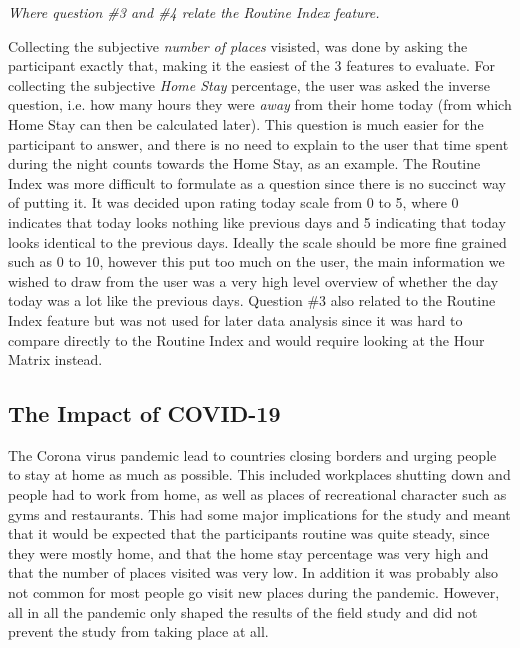 \textit{Where question \#3 and \#4 relate the Routine Index feature.}

Collecting the subjective \textit{number of places} visisted, was done by asking the participant exactly that, making it the easiest of the 3 features to evaluate. For collecting the subjective \textit{Home Stay} percentage, the user was asked the inverse question, i.e. how many hours they were \textit{away} from their home today (from which Home Stay can then be calculated later). This question is much easier for the participant to answer, and there is no need to explain to the user that time spent during the night counts towards the Home Stay, as an example. The Routine Index was more difficult to formulate as a question since there is no succinct way of putting it. It was decided upon rating today scale from 0 to 5, where 0 indicates that today looks nothing like previous days and 5 indicating that today looks identical to the previous days. Ideally the scale should be more fine grained such as 0 to 10, however this put too much on the user, the main information we wished to draw from the user was a very high level overview of whether the day today was a lot like the previous days. Question \#3 also related to the Routine Index feature but was not used for later data analysis since it was hard to compare directly to the Routine Index and would require looking at the Hour Matrix instead.

\subsection{The Impact of COVID-19}
The Corona virus pandemic lead to countries closing borders and urging people to stay at home as much as possible. This included workplaces shutting down and people had to work from home, as well as places of recreational character such as gyms and restaurants. This had some major implications for the study and meant that it would be expected that the participants routine was quite steady, since they were mostly home, and that the home stay percentage was very high and that the number of places visited was very low. In addition it was probably also not common for most people go visit new places during the pandemic. However, all in all the pandemic only shaped the results of the field study and did not prevent the study from taking place at all.


